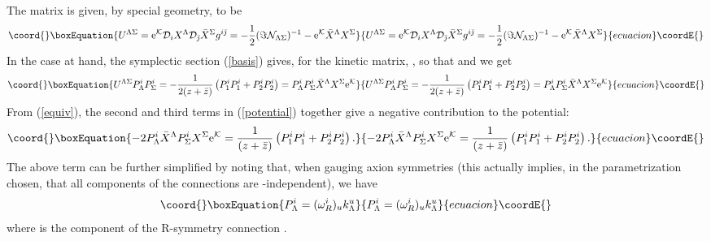 \documentclass[a4paper,12pt]{article}
\begin{document}
The matrix \coordHE{} is given, by special geometry, to be 
\begin{equation}\coord{}\boxEquation{
U^{\Lambda\Sigma} ={\rm e}^{\mathcal K} {\mathcal D}_i X^\Lambda{\mathcal D}_{\bar\jmath}\bar X^\Sigma g^{i\bar\jmath}=
-\frac 12 (\Im {\mathcal N}_{\Lambda\Sigma})^{-1} - {\rm e}^{\mathcal K}\bar X^\Lambda X^\Sigma 
}{
U^{\Lambda\Sigma} ={\rm e}^{\mathcal K} {\mathcal D}_i X^\Lambda{\mathcal D}_{\bar\jmath}\bar X^\Sigma g^{i\bar\jmath}=
-\frac 12 (\Im {\mathcal N}_{\Lambda\Sigma})^{-1} - {\rm e}^{\mathcal K}\bar X^\Lambda X^\Sigma 
}{ecuacion}\coordE{}\end{equation}
In the case at hand, the symplectic section (\ref{basis}) gives, for the kinetic matrix,
  \coordHE{}, so that
 \coordHE{} and we get
\begin{equation}\coord{}\boxEquation{
U^{\Lambda\Sigma} P^i_\Lambda P^i_\Sigma = -\frac 1 {2 (z+\bar z)}\left(
P^i_1 P^i_1 + P^i_2 P^i_2\right)=
P^i_\Lambda P^i_\Sigma \bar X^\Lambda X^\Sigma {\rm e}^{\mathcal K}
\label{equiv}
}{
U^{\Lambda\Sigma} P^i_\Lambda P^i_\Sigma = -\frac 1 {2 (z+\bar z)}\left(
P^i_1 P^i_1 + P^i_2 P^i_2\right)=
P^i_\Lambda P^i_\Sigma \bar X^\Lambda X^\Sigma {\rm e}^{\mathcal K}
}{ecuacion}\coordE{}\end{equation}
From (\ref{equiv}), the second and third terms in (\ref{potential}) 
together give a negative contribution to the potential:
\begin{equation}\coord{}\boxEquation{
-2 P^i_\Lambda \bar X^\Lambda P^i_\Sigma X^\Sigma {\rm e}^{\mathcal K} = \frac 1 {(z+\bar z)}
\left(P^i_1 P^i_1 + P^i_2 P^i_2\right).
}{
-2 P^i_\Lambda \bar X^\Lambda P^i_\Sigma X^\Sigma {\rm e}^{\mathcal K} = \frac 1 {(z+\bar z)}
\left(P^i_1 P^i_1 + P^i_2 P^i_2\right).
}{ecuacion}\coordE{}\end{equation}
The above term can be further simplified by noting that, when gauging axion symmetries (this actually implies, 
in the parametrization chosen, that all components of the \coordHE{} connections are \coordHE{}-independent), we have \cite{abcdffm,mic,agata}
\begin{equation}\coord{}\boxEquation{
P^i_\Lambda = (\omega^i_R)_u k^u_\Lambda
\label{simplep}
}{
P^i_\Lambda = (\omega^i_R)_u k^u_\Lambda
}{ecuacion}\coordE{}\end{equation}
where \coordHE{} is the component of the R-symmetry \coordHE{} connection \coordHE{}.
\end{document}
